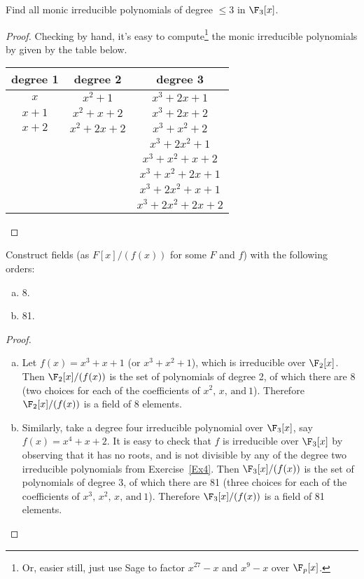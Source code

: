\documentclass[10pt]{amsart}
\begin{document}
\begin{thm}\label{Ex4}
  Find all monic irreducible polynomials of degree $\leq 3$ in $\F_3[x]$.
  \begin{proof}
    Checking by hand, it's easy to compute\footnote{Or, easier still, just use Sage to factor $x^{27} - x$ and $x^9 - x$ over $\F_p[x]$.} the monic irreducible polynomials by given by the table below.
    \begin{center}
      \begin{tabular}{|c|c|c|}
        \hline
        degree 1 & degree 2 & degree 3\\
        \hline
        $x$ & $x^2 + 1$ & $x^3 + 2x + 1$\\ 
        $x+1$ & $x^2 + x + 2$ & $x^3 + 2x + 2$\\
        $x + 2$ & $x^2 + 2x + 2$ & $x^3 + x^2 + 2$\\
        &&$x^3 + 2x^2 + 1$\\
        &&$x^3 + x^2 + x + 2$\\
        &&$x^3 + x^2 + 2x + 1$\\
        &&$x^3 + 2x^2 + x + 1$\\
        &&$x^3 + 2x^2 + 2x + 2$\\
        \hline
      \end{tabular}
    \end{center}
  \end{proof}
\end{thm}

\begin{thm}
  Construct fields (as $F[x]/(f(x))$ for some $F$ and $f$) with the following orders:
  \begin{enumerate}[(a)]
  \item
    8.
  \item
    81.
  \end{enumerate}
  
  \begin{proof}
    \begin{enumerate}[(a)]
    \item
      Let $f(x) = x^3 + x + 1$ (or $x^3 + x^2 + 1$), which is irreducible over $\F_2[x]$.
      Then $\F_2[x]/(f(x))$ is the set of polynomials of degree 2, of which there are 8 (two choices for each of the coefficients of $x^2,\, x,\, \text{and}\ 1$).
      Therefore $\F_2[x]/(f(x))$ is a field of 8 elements.
    \item
      Similarly, take a degree four irreducible polynomial over $\F_3[x]$, say $f(x) = x^4 + x + 2$.
      It is easy to check that $f$ is irreducible over $\F_3[x]$ by observing that it has no roots, and is not divisible by any of the degree two irreducible polynomials from Exercise~\ref{Ex4}.
      Then $\F_3[x]/(f(x))$ is the set of polynomials of degree 3, of which there are 81 (three choices for each of the coefficients of $x^3,\, x^2,\, x,\, \text{and}\ 1$).
      Therefore $\F_3[x]/(f(x))$ is a field of 81 elements.
    \end{enumerate}
  \end{proof}
\end{thm}
\end{document}
